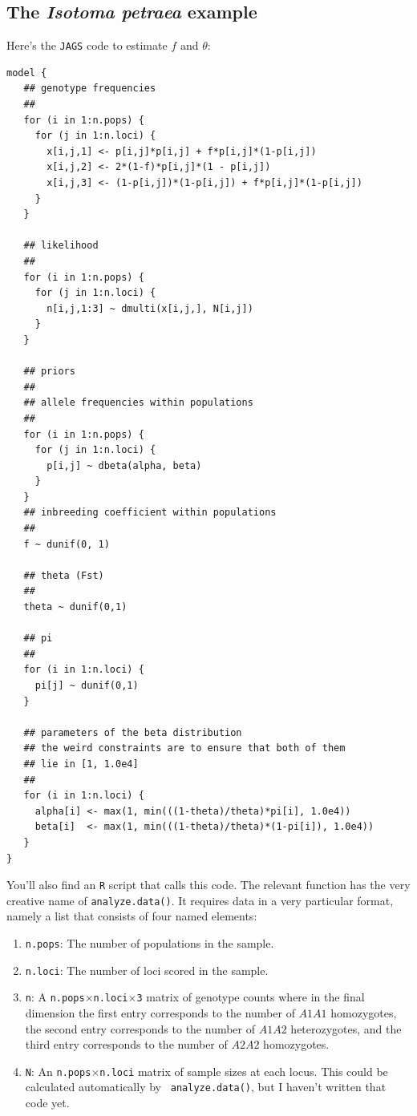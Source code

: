 \subsection*{The {\it Isotoma petraea} example}

Here's the {\tt JAGS} code to estimate $f$ and $\theta$:
\begin{verbatim}
model {
   ## genotype frequencies
   ##
   for (i in 1:n.pops) {
     for (j in 1:n.loci) {
       x[i,j,1] <- p[i,j]*p[i,j] + f*p[i,j]*(1-p[i,j])
       x[i,j,2] <- 2*(1-f)*p[i,j]*(1 - p[i,j])
       x[i,j,3] <- (1-p[i,j])*(1-p[i,j]) + f*p[i,j]*(1-p[i,j])
     }
   }

   ## likelihood
   ##
   for (i in 1:n.pops) {
     for (j in 1:n.loci) {
       n[i,j,1:3] ~ dmulti(x[i,j,], N[i,j])
     }
   }

   ## priors
   ##
   ## allele frequencies within populations
   ##
   for (i in 1:n.pops) {
     for (j in 1:n.loci) {
       p[i,j] ~ dbeta(alpha, beta)
     }
   }
   ## inbreeding coefficient within populations
   ##
   f ~ dunif(0, 1)

   ## theta (Fst)
   ##
   theta ~ dunif(0,1)

   ## pi
   ##
   for (i in 1:n.loci) {
     pi[j] ~ dunif(0,1)
   }

   ## parameters of the beta distribution
   ## the weird constraints are to ensure that both of them
   ## lie in [1, 1.0e4]
   ##
   for (i in 1:n.loci) {
     alpha[i] <- max(1, min(((1-theta)/theta)*pi[i], 1.0e4))
     beta[i]  <- max(1, min(((1-theta)/theta)*(1-pi[i]), 1.0e4))
   }
}
\end{verbatim}

You'll also find an {\tt R} script that calls this code. The relevant
function has the very creative name of {\tt analyze.data()}. It
requires data in a very particular format, namely a list that consists
of four named elements:

\begin{enumerate}

\item {\tt n.pops}: The number of populations in the sample.

\item {\tt n.loci}: The number of loci scored in the sample.

\item {\tt n}: A {\tt n.pops}$\times${\tt n.loci}$\times${\tt 3}
  matrix of genotype counts where in the final dimension the first
  entry corresponds to the number of $A1A1$ homozygotes, the second
  entry corresponds to the number of $A1A2$ heterozygotes, and the
  third entry corresponds to the number of $A2A2$ homozygotes.

\item {\tt N}: An {\tt n.pops}$\times${\tt n.loci} matrix of sample
  sizes at each locus. This could be calculated automatically by {\tt
    analyze.data()}, but I haven't written that code yet.

\end{enumerate}

